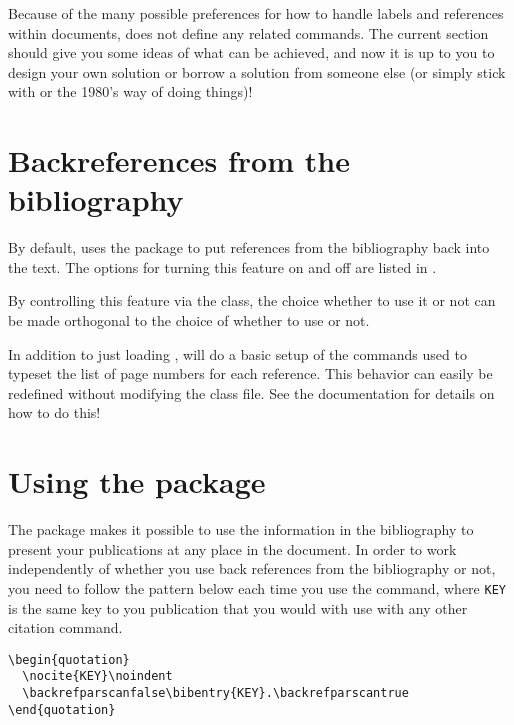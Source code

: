 Because of the many possible preferences for how to handle labels and references within documents, \rtthesis does not define any related commands.  The current section should give you some ideas of what can be achieved, and now it is up to you to design your own solution or borrow a solution from someone else (or simply stick with  or the 1980's way of doing things)!

\section{Backreferences from the bibliography}
%
By default, \rtthesis uses the  package to put references from the bibliography back into the text.  The options for turning this feature on and off are listed in .

By controlling this feature via the class, the choice whether to use it or not can be made orthogonal to the choice of whether to use  or not.

In addition to just loading , \rtthesis will do a basic setup of the commands used to typeset the list of page numbers for each reference.  This behavior can easily be redefined without modifying the \rtthesis class file.  See the  documentation for details on how to do this!

\section{Using the  package}\label{sec:rtthesis:bibentry}
%
The  package makes it possible to use the information in the bibliography to present your publications at any place in the document.  In order to work independently of whether you use back references from the bibliography or not, you need to follow the pattern below each time you use the  command, where \texttt{KEY} is the same key to you publication that you would with use with any other citation command.

\begin{minipage}{1.0\linewidth}
  \verbatimsize
\begin{verbatim}
\begin{quotation}
  \nocite{KEY}\noindent
  \backrefparscanfalse\bibentry{KEY}.\backrefparscantrue
\end{quotation}
\end{verbatim}
\end{minipage}

